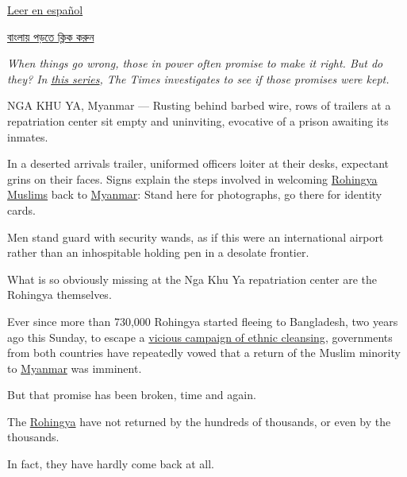 \href{https://www.nytimes3xbfgragh.onion/es/2019/08/26/espanol/mundo/rohinya-exodo-banglades.html}{Leer
en español}

\href{https://www.nytimes3xbfgragh.onion/2019/08/25/world/asia/bengali-rohingya-promises-made.html}{বাংলায়
পড়তে ক্লিক করুন}

\emph{When things go wrong, those in power often promise to make it
right. But do they? In}
\emph{\href{https://www.nytimes3xbfgragh.onion/spotlight/promises-made?module=inline}{this
series}, The Times investigates to see if those promises were kept.}

NGA KHU YA, Myanmar --- Rusting behind barbed wire, rows of trailers at
a repatriation center sit empty and uninviting, evocative of a prison
awaiting its inmates.

In a deserted arrivals trailer, uniformed officers loiter at their
desks, expectant grins on their faces. Signs explain the steps involved
in welcoming
\href{https://www.nytimes3xbfgragh.onion/2020/01/23/world/asia/myanmar-rohingya-genocide.html}{Rohingya
Muslims} back to
\href{https://www.nytimes3xbfgragh.onion/2020/01/23/world/asia/myanmar-rohingya-genocide.html}{Myanmar}:
Stand here for photographs, go there for identity cards.

Men stand guard with security wands, as if this were an international
airport rather than an inhospitable holding pen in a desolate frontier.

What is so obviously missing at the Nga Khu Ya repatriation center are
the Rohingya themselves.

Ever since more than 730,000 Rohingya started fleeing to Bangladesh, two
years ago this Sunday, to escape a
\href{https://www.nytimes3xbfgragh.onion/2017/09/02/world/asia/rohingya-myanmar-bangladesh-refugees-massacre.html?action=click\&module=RelatedCoverage\&pgtype=Article\&region=Footer}{vicious
campaign of ethnic cleansing}, governments from both countries have
repeatedly vowed that a return of the Muslim minority to
\href{https://www.nytimes3xbfgragh.onion/2020/01/23/world/asia/myanmar-rohingya-genocide.html}{Myanmar}
was imminent.

But that promise has been broken, time and again.

The
\href{https://www.nytimes3xbfgragh.onion/2020/01/23/world/asia/myanmar-rohingya-genocide.html}{Rohingya}
have not returned by the hundreds of thousands, or even by the
thousands.

In fact, they have hardly come back at all.

